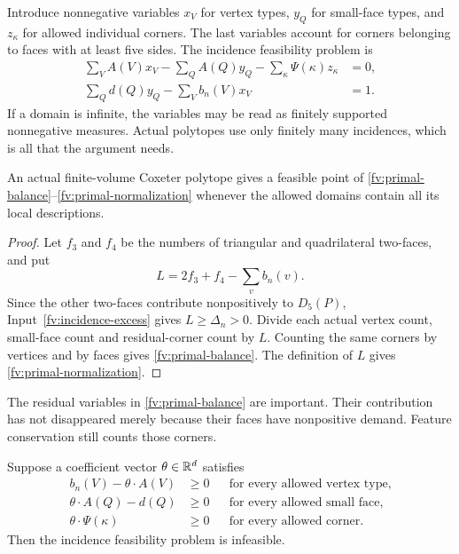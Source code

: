 Introduce nonnegative variables $x_V$ for vertex types, $y_Q$ for
small-face types, and $z_\kappa$ for allowed individual corners. The
last variables account for corners belonging to faces with at least
five sides. The incidence feasibility problem is
\begin{align}
 \sum_VA(V)x_V-\sum_QA(Q)y_Q-
       \sum_\kappa\Psi(\kappa)z_\kappa&=0,
       \label{fv:primal-balance}\\
 \sum_Qd(Q)y_Q-\sum_Vb_n(V)x_V&=1.
       \label{fv:primal-normalization}
\end{align}
If a domain is infinite, the variables may be read as finitely
supported nonnegative measures. Actual polytopes use only finitely
many incidences, which is all that the argument needs.

\begin{lemma}\label{fv:actual-lift}
An actual finite-volume Coxeter polytope gives a feasible point of
\eqref{fv:primal-balance}--\eqref{fv:primal-normalization} whenever
the allowed domains contain all its local descriptions.
\end{lemma}

\begin{proof}
Let $f_3$ and $f_4$ be the numbers of triangular and quadrilateral
two-faces, and put
\[
 L=2f_3+f_4-\sum_vb_n(v).
\]
Since the other two-faces contribute nonpositively to $D_5(P)$,
Input~\ref{fv:incidence-excess} gives
$L\ge\Delta_n>0$. Divide each actual vertex count, small-face count
and residual-corner count by $L$. Counting the same corners by vertices
and by faces gives \eqref{fv:primal-balance}. The definition of $L$
gives \eqref{fv:primal-normalization}.
\end{proof}

The residual variables in \eqref{fv:primal-balance} are important.
Their contribution has not disappeared merely because their faces have
nonpositive demand. Feature conservation still counts those corners.

\begin{proposition}\label{fv:charge-certificate}
Suppose a coefficient vector $\theta\in\mathbb R^d$ satisfies
\begin{align}
 b_n(V)-\theta\cdot A(V)&\ge0 &&\text{for every allowed vertex type},
    \label{fv:vertex-certificate}\\
 \theta\cdot A(Q)-d(Q)&\ge0 &&\text{for every allowed small face},
    \label{fv:face-certificate}\\
 \theta\cdot\Psi(\kappa)&\ge0 &&\text{for every allowed corner}.
    \label{fv:corner-certificate}
\end{align}
Then the incidence feasibility problem is infeasible.
\end{proposition}

